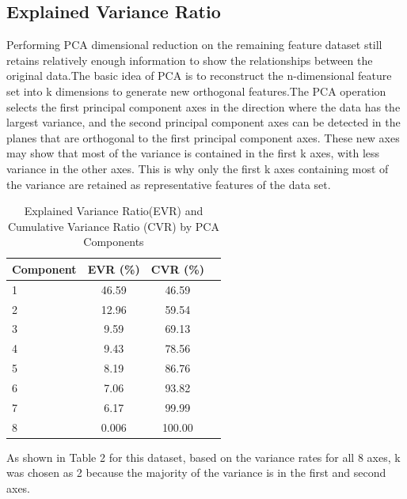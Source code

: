 \documentclass[twocolumn]{IEEEtran}
\begin{document}
\subsection{Explained Variance Ratio}
Performing PCA dimensional reduction on the remaining feature dataset still retains relatively enough information to show the relationships between the original data.The basic idea of PCA is to reconstruct the n-dimensional feature set into k dimensions to generate new orthogonal features.The PCA operation selects the first principal component axes in the direction where the data has the largest variance, and the second principal component axes can be detected in the planes that are orthogonal to the first principal component axes. These new axes may show that most of the variance is contained in the first k axes, with less variance in the other axes. This is why only the first k axes containing most of the variance are retained as representative features of the data set. 
\begin{table}[H]
    \centering
    \begin{tabular}{@{}lccc@{}}
    \hline
    \textbf{Component} & \textbf{EVR (\%)} & \textbf{CVR (\%)} \\
    \hline
    1 & 46.59 & 46.59 \\
    2 & 12.96 & 59.54 \\
    3 & 9.59 & 69.13 \\
    4 & 9.43 & 78.56 \\
    5 & 8.19 & 86.76 \\
    6 & 7.06 & 93.82 \\
    7 & 6.17 & 99.99 \\
    8 & 0.006 & 100.00 \\
    \hline
    \end{tabular}
    \caption{Explained Variance Ratio(EVR) and Cumulative Variance Ratio (CVR) by PCA Components}
    \label{tab:pca_variance}
\end{table}
    
As shown in Table 2 for this dataset, based on the variance rates for all 8 axes, k was chosen as 2 because the majority of the variance is in the first and second axes.


\end{document}

